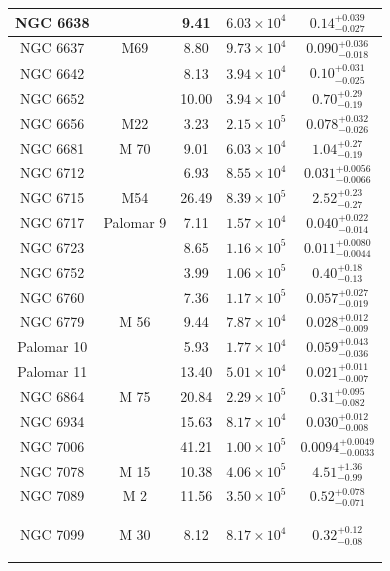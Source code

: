 \begin{longtable}{|c|c|c|c|c|}
\hline
NGC 6638 & & 9.41 & $6.03\times 10^{4}$ & $0.14_{-0.027}^{+0.039 }$ \\
\hline
NGC 6637 & M69 & 8.80 & $9.73\times 10^{4}$ & $0.090_{-0.018}^{+0.036 }$ \\
\hline
NGC 6642 & & 8.13 & $3.94\times 10^{4}$ & $0.10_{-0.025}^{+0.031 }$ \\
\hline
NGC 6652 & & 10.00 & $3.94\times 10^{4}$ & $0.70_{-0.19}^{+0.29 }$ \\
\hline
NGC 6656 & M22 & 3.23 & $2.15\times 10^{5}$ & $0.078_{-0.026}^{+0.032 }$ \\
\hline
NGC 6681 & M 70 & 9.01 & $6.03\times 10^{4}$ & $1.04_{-0.19}^{+0.27 }$ \\
\hline
NGC 6712 & & 6.93 & $8.55\times 10^{4}$ & $0.031_{-0.0066}^{+0.0056 }$ \\
\hline
NGC 6715 & M54 & 26.49 & $8.39\times 10^{5}$ & $2.52_{-0.27}^{+0.23 }$ \\
\hline
NGC 6717 & Palomar 9 & 7.11 & $1.57\times 10^{4}$ & $0.040_{-0.014}^{+0.022 }$ \\
\hline 
NGC 6723 & & 8.65 & $1.16\times 10^{5}$ & $0.011_{-0.0044}^{+0.0080 }$ \\
\hline
NGC 6752 & & 3.99 & $1.06\times 10^{5}$ & $0.40_{-0.13}^{+0.18 }$ \\
\hline
NGC 6760 & & 7.36 & $1.17\times 10^{5}$ & $0.057_{-0.019}^{+0.027 }$ \\
\hline
NGC 6779 & M 56 & 9.44 & $7.87\times 10^{4}$ & $0.028_{-0.009}^{+0.012 }$ \\
\hline
Palomar 10 & & 5.93 & $1.77\times 10^{4}$ & $0.059_{-0.036}^{+0.043 }$ \\
\hline
Palomar 11 & & 13.40 & $5.01\times 10^{4}$ & $0.021_{-0.007}^{+0.011 }$ \\
\hline
NGC 6864 & M 75 & 20.84 & $2.29\times 10^{5}$ & $0.31_{-0.082}^{+0.095 }$ \\
\hline
NGC 6934 & & 15.63 & $8.17\times 10^{4}$ & $0.030_{-0.008}^{+0.012 }$ \\
\hline
NGC 7006 & & 41.21 & $1.00\times 10^{5}$ & $0.0094^{+0.0049}_{-0.0033}$ \\
\hline
NGC 7078 & M 15 & 10.38 & $4.06\times 10^{5}$ & $4.51_{-0.99}^{+1.36 }$ \\
\hline
NGC 7089 & M 2 & 11.56 & $3.50\times 10^{5}$ & $0.52_{-0.071}^{+0.078 }$ \\
\hline
NGC 7099 & M 30 & 8.12 & $8.17\times 10^{4}$ & $0.32_{-0.08}^{+0.12 }$ 

\label{tab:tab7-9-hopper-linden}
\end{longtable}
\endgroup